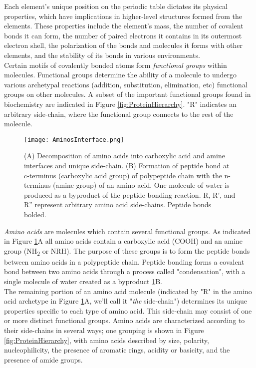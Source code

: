 {Each element's unique position on the periodic table dictates its physical properties, which have implications in higher-level structures formed from the elements.  These properties include the element's mass, the number of covalent bonds it can form, the number of paired electrons it contains in its outermost electron shell, the polarization of the bonds and molecules it forms with other elements, and the stability of its bonds in various environments.\\

Certain motifs of covalently bonded atoms form \textit{functional groups} within molecules.  Functional groups determine the ability of a molecule to undergo various archetypal reactions (addition, substitution, elimination, etc) functional groups on other molecules.  A subset of the important functional groups found in biochemistry are indicated in Figure \ref{fig:ProteinHierarchy}.  "R" indicates an arbitrary side-chain, where the functional group connects to the rest of the molecule.\\



\begin{figure}
  \texttt{[image: AminosInterface.png]}
  \caption{(A) Decomposition of amino acids into carboxylic acid and amine interfaces and unique side-chain. (B) Formation of peptide bond at c-terminus (carboxylic acid group) of polypeptide chain with the n-terminus (amine group) of an amino acid. One molecule of water is produced as a byproduct of the peptide bonding reaction.  R, R', and R'' represent arbitrary amino acid side-chains.  Peptide bonds bolded.}
  \label{fig:AminosInterface}
\end{figure}

\textit{Amino acids} are molecules which contain several functional groups.  As indicated in Figure \ref{fig:AminosInterface}A all amino acids contain a carboxylic acid (COOH) and an amine group (NH\textsubscript{2} or NRH).  The purpose of these groups is to form the peptide bonds between amino acids in a polypeptide chain.  Peptide bonding forms a covalent bond between two amino acids through a process called "condensation", with a single molecule of water created as a byproduct \ref{fig:AminosInterface}B.\\

The remaining portion of an amino acid molecule (indicated by "R" in the amino acid archetype in Figure \ref{fig:AminosInterface}A, we'll call it "\textit{the} side-chain") determines its unique properties specific to each type of amino acid.  This side-chain may consist of one or more distinct functional groups.  Amino acids are characterized according to their side-chains in several ways; one grouping is shown in Figure \ref{fig:ProteinHierarchy}, with amino acids described by size, polarity, nucleophilicity, the presence of aromatic rings, acidity or basicity, and the presence of amide groups.\\

}
